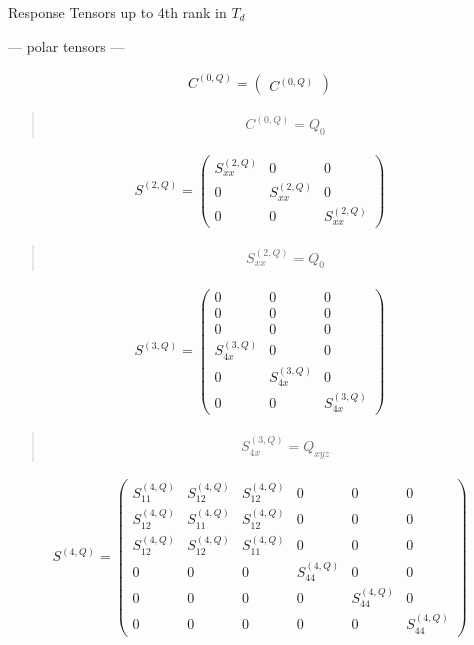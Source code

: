 \documentclass[fleqn,10pt]{jsarticle}
\begin{document}
\setcounter{MaxMatrixCols}{16}

\begin{center}
\LARGE
Response Tensors up to 4th rank in $T_{d}$
\end{center}
\begin{center}\LARGE --- polar tensors ---\end{center}
\begin{align*}
C^{(0,Q)} = \begin{pmatrix} C^{(0,Q)} \end{pmatrix}
\end{align*}
\begin{quote}
\begin{align*}
& C^{(0,Q)} = Q_{0}
\end{align*}
\end{quote}
\begin{align*}
S^{(2,Q)} = \begin{pmatrix} S^{(2,Q)}_{xx} & 0 & 0 \\ 0 & S^{(2,Q)}_{xx} & 0 \\ 0 & 0 & S^{(2,Q)}_{xx} \end{pmatrix}
\end{align*}
\begin{quote}
\begin{align*}
& S^{(2,Q)}_{xx} = Q_{0}
\end{align*}
\end{quote}
\begin{align*}
S^{(3,Q)} = \begin{pmatrix} 0 & 0 & 0 \\ 0 & 0 & 0 \\ 0 & 0 & 0 \\ S^{(3,Q)}_{4x} & 0 & 0 \\ 0 & S^{(3,Q)}_{4x} & 0 \\ 0 & 0 & S^{(3,Q)}_{4x} \end{pmatrix}
\end{align*}
\begin{quote}
\begin{align*}
& S^{(3,Q)}_{4x} = Q_{xyz}
\end{align*}
\end{quote}
\begin{align*}
S^{(4,Q)} = \begin{pmatrix} S^{(4,Q)}_{11} & S^{(4,Q)}_{12} & S^{(4,Q)}_{12} & 0 & 0 & 0 \\ S^{(4,Q)}_{12} & S^{(4,Q)}_{11} & S^{(4,Q)}_{12} & 0 & 0 & 0 \\ S^{(4,Q)}_{12} & S^{(4,Q)}_{12} & S^{(4,Q)}_{11} & 0 & 0 & 0 \\ 0 & 0 & 0 & S^{(4,Q)}_{44} & 0 & 0 \\ 0 & 0 & 0 & 0 & S^{(4,Q)}_{44} & 0 \\ 0 & 0 & 0 & 0 & 0 & S^{(4,Q)}_{44} \end{pmatrix}
\end{align*}
\end{document}
